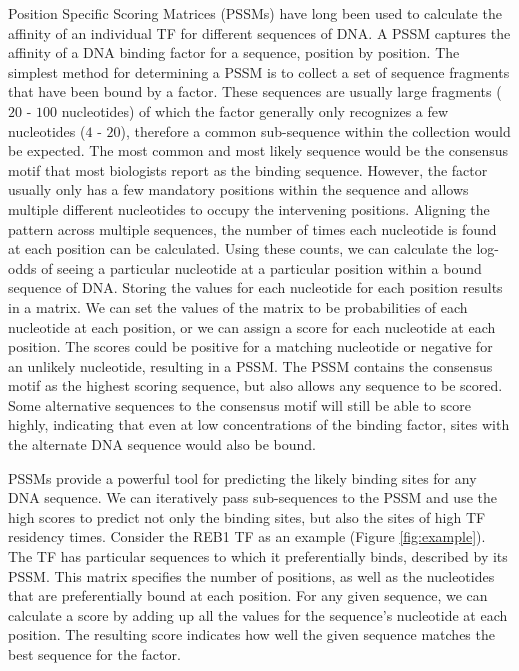 \documentclass{article}
\newcommand{\tab}{\hspace{9mm}}
\begin{document}
\tab Position Specific Scoring Matrices (PSSMs) have long been used to calculate the affinity of an individual TF for different sequences of DNA. A PSSM captures the affinity of a DNA binding factor for a sequence, position by position. The simplest method for determining a PSSM is to collect a set of sequence fragments that have been bound by a factor. These sequences are usually large fragments ($20$ - $100$ nucleotides) of which the factor generally only recognizes a few nucleotides ($4$ - $20$), therefore a common sub-sequence within the collection would be expected. The most common and most likely sequence would be the consensus motif that most biologists report as the binding sequence. However, the factor usually only has a few mandatory positions within the sequence and allows multiple different nucleotides to occupy the intervening positions. Aligning the pattern across multiple sequences, the number of times each nucleotide is found at each position can be calculated. Using these counts, we can calculate the log-odds of seeing a particular nucleotide at a particular position within a bound sequence of DNA. Storing the values for each nucleotide for each position results in a matrix. We can set the values of the matrix to be probabilities of each nucleotide at each position, or we can assign a score for each nucleotide at each position. The scores could be positive for a matching nucleotide or negative for an unlikely nucleotide, resulting in a PSSM. The PSSM contains the consensus motif as the highest scoring sequence, but also allows any sequence to be scored. Some alternative sequences to the consensus motif will still be able to score highly, indicating that even at low concentrations of the binding factor, sites with the alternate DNA sequence would also be bound.

\tab PSSMs provide a powerful tool for predicting the likely binding sites for any DNA sequence. We can iteratively pass sub-sequences to the PSSM and use the high scores to predict not only the binding sites, but also the sites of high TF residency times. Consider the REB1 TF as an example (Figure \ref{fig:example}). The TF has particular sequences to which it preferentially binds, described by its PSSM. This matrix specifies the number of positions, as well as the nucleotides that are preferentially bound at each position. For any given sequence, we can calculate a score by adding up all the values for the sequence’s nucleotide at each position. The resulting score indicates how well the given sequence matches the best sequence for the factor.
\end{document}
